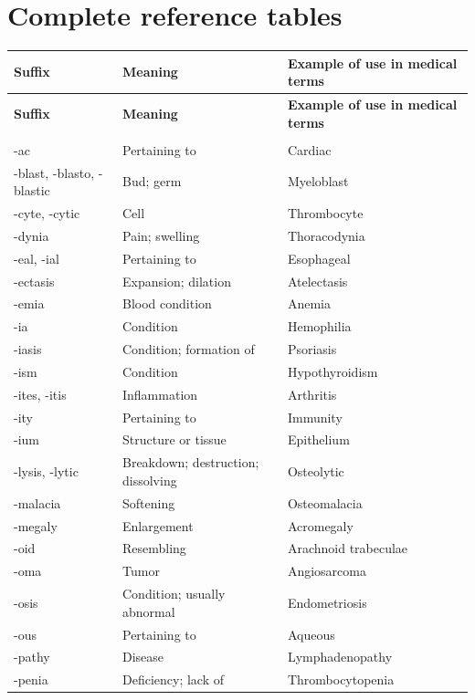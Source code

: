 \section*{Complete reference tables}
\small
\setlength{\LTleft}{0pt}
\setlength{\LTright}{0pt}
\begin{longtable}{>{\raggedright\arraybackslash}p{} >{\raggedright\arraybackslash}p{} >{\raggedright\arraybackslash}p{}}
\toprule
\textbf{Suffix} & \textbf{Meaning} & \textbf{Example of use in medical terms} \\
\midrule
\endfirsthead
\toprule
\textbf{Suffix} & \textbf{Meaning} & \textbf{Example of use in medical terms} \\
\midrule
\endhead
\bottomrule
\endfoot
\multicolumn{3}{l}{\textbf{Common suffixes}} \\
-ac & Pertaining to & Cardiac \\
-blast, -blasto, -blastic & Bud; germ & Myeloblast \\
-cyte, -cytic & Cell & Thrombocyte \\
-dynia & Pain; swelling & Thoracodynia \\
-eal, -ial & Pertaining to & Esophageal \\
-ectasis & Expansion; dilation & Atelectasis \\
-emia & Blood condition & Anemia \\
-ia & Condition & Hemophilia \\
-iasis & Condition; formation of & Psoriasis \\
-ism & Condition & Hypothyroidism \\
-ites, -itis & Inflammation & Arthritis \\
-ity & Pertaining to & Immunity \\
-ium & Structure or tissue & Epithelium \\
-lysis, -lytic & Breakdown; destruction; dissolving & Osteolytic \\
-malacia & Softening & Osteomalacia \\
-megaly & Enlargement & Acromegaly \\
-oid & Resembling & Arachnoid trabeculae \\
-oma & Tumor & Angiosarcoma \\
-osis & Condition; usually abnormal & Endometriosis \\
-ous & Pertaining to & Aqueous \\
-pathy & Disease & Lymphadenopathy \\
-penia & Deficiency; lack of & Thrombocytopenia \\

\end{longtable}
